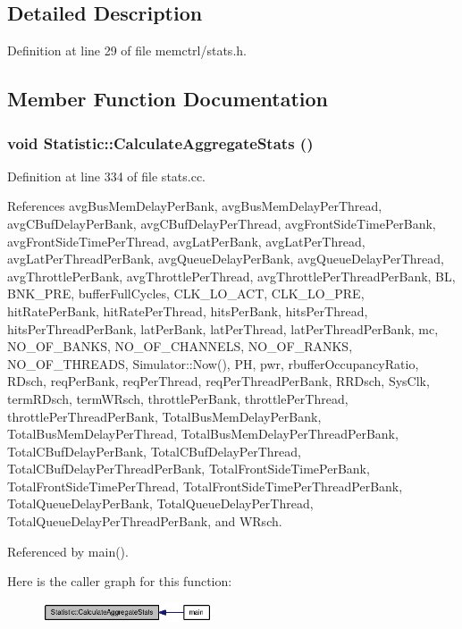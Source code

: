 \subsection{Detailed Description}


Definition at line 29 of file memctrl/stats.h.

\subsection{Member Function Documentation}
\subsubsection[{CalculateAggregateStats}]{\setlength{\rightskip}{0pt plus 5cm}void Statistic::CalculateAggregateStats ()}\label{classStatistic_833f4ab2c90268e5abf2a5b2e9906a31}




Definition at line 334 of file stats.cc.

References avgBusMemDelayPerBank, avgBusMemDelayPerThread, avgCBufDelayPerBank, avgCBufDelayPerThread, avgFrontSideTimePerBank, avgFrontSideTimePerThread, avgLatPerBank, avgLatPerThread, avgLatPerThreadPerBank, avgQueueDelayPerBank, avgQueueDelayPerThread, avgThrottlePerBank, avgThrottlePerThread, avgThrottlePerThreadPerBank, BL, BNK\_\-PRE, bufferFullCycles, CLK\_\-LO\_\-ACT, CLK\_\-LO\_\-PRE, hitRatePerBank, hitRatePerThread, hitsPerBank, hitsPerThread, hitsPerThreadPerBank, latPerBank, latPerThread, latPerThreadPerBank, mc, NO\_\-OF\_\-BANKS, NO\_\-OF\_\-CHANNELS, NO\_\-OF\_\-RANKS, NO\_\-OF\_\-THREADS, Simulator::Now(), PH, pwr, rbufferOccupancyRatio, RDsch, reqPerBank, reqPerThread, reqPerThreadPerBank, RRDsch, SysClk, termRDsch, termWRsch, throttlePerBank, throttlePerThread, throttlePerThreadPerBank, TotalBusMemDelayPerBank, TotalBusMemDelayPerThread, TotalBusMemDelayPerThreadPerBank, TotalCBufDelayPerBank, TotalCBufDelayPerThread, TotalCBufDelayPerThreadPerBank, TotalFrontSideTimePerBank, TotalFrontSideTimePerThread, TotalFrontSideTimePerThreadPerBank, TotalQueueDelayPerBank, TotalQueueDelayPerThread, TotalQueueDelayPerThreadPerBank, and WRsch.

Referenced by main().

Here is the caller graph for this function:\nopagebreak
\begin{figure}[H]
\begin{center}
\leavevmode
\includegraphics[width=142pt]{classStatistic_833f4ab2c90268e5abf2a5b2e9906a31_icgraph}
\end{center}
\end{figure}
